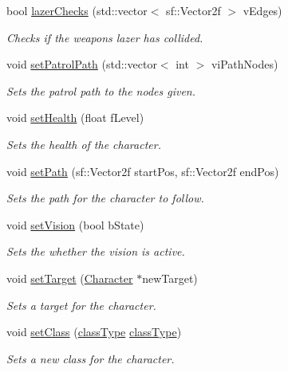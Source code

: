 \begin{DoxyCompactItemize}
bool \hyperlink{class_character_ac40a807deb125f3c6da03ffeebe157f4}{lazer\+Checks} (std\+::vector$<$ sf\+::\+Vector2f $>$ v\+Edges)
\begin{DoxyCompactList}\small\item\em Checks if the weapons lazer has collided. \end{DoxyCompactList}\item 
void \hyperlink{class_character_a35bdf7823ddd768ac34ae91e3681165f}{set\+Patrol\+Path} (std\+::vector$<$ int $>$ vi\+Path\+Nodes)
\begin{DoxyCompactList}\small\item\em Sets the patrol path to the nodes given. \end{DoxyCompactList}\item 
void \hyperlink{class_character_a272568879408954cd2e6dc18520be441}{set\+Health} (float f\+Level)
\begin{DoxyCompactList}\small\item\em Sets the health of the character. \end{DoxyCompactList}\item 
void \hyperlink{class_character_a4135c75013813ae37fc4212a3000cabb}{set\+Path} (sf\+::\+Vector2f start\+Pos, sf\+::\+Vector2f end\+Pos)
\begin{DoxyCompactList}\small\item\em Sets the path for the character to follow. \end{DoxyCompactList}\item 
void \hyperlink{class_character_a360fa750198888b54a96f0c811de1893}{set\+Vision} (bool b\+State)
\begin{DoxyCompactList}\small\item\em Sets the whether the vision is active. \end{DoxyCompactList}\item 
void \hyperlink{class_character_a7a318c427231b03423bd65af5f257776}{set\+Target} (\hyperlink{class_character}{Character} $\ast$new\+Target)
\begin{DoxyCompactList}\small\item\em Sets a target for the character. \end{DoxyCompactList}\item 
void \hyperlink{class_character_a87ea11fe81e35a6efb7d465b01b10332}{set\+Class} (\hyperlink{_weapon_8h_ab84a9103ee8e782337e098ae19af7a29}{class\+Type} \hyperlink{_weapon_8h_ab84a9103ee8e782337e098ae19af7a29}{class\+Type})
\begin{DoxyCompactList}\small\item\em Sets a new class for the character. \end{DoxyCompactList}\item 

\end{DoxyCompactItemize}
